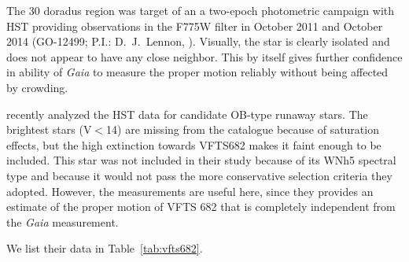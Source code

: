 \documentclass[apjl,twocolumn]{emulateapj}
\newcommand{\SdM}[1]{{{\color{brown}{#1}}}}
\newcommand{\masyr}{\,\mathrm{mas}\,\mathrm{yr}^{-1}}
\DeclareRobustCommand{\Tabref}[1]{Table~\ref{#1}}
\begin{document}

The 30 doradus region was target of an a two-epoch photometric campaign with HST providing observations in the F775W filter in October 2011 and October 2014 (GO-12499; P.I.: D.~J.~Lennon, \citealt{sabbi:13}). Visually, the star is clearly isolated and does not appear to have any close neighbor. This by itself gives further confidence in ability of \emph{Gaia} to measure the proper motion reliably without being affected by crowding. 


 \citet{platais:18} recently analyzed the HST data for candidate
 OB-type runaway stars. The brightest stars (V$<$14) are missing from
 the catalogue because of saturation effects, but the high extinction
 towards VFTS682 makes it faint enough to be included.
 This star was not included in their study because of its WNh5
 spectral type and because it would not pass the more conservative
 selection criteria they adopted.
 However, the measurements are useful here, since they provides an
 estimate of the proper motion of VFTS 682 that is completely independent from the \emph{Gaia} measurement. 
 
We list their data in \Tabref{tab:vfts682}.  





\end{document}
